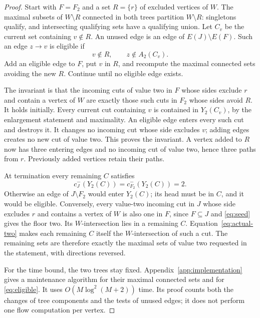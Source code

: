 \documentclass[11pt]{article}
\theoremstyle{definition}
\theoremstyle{remark}
\begin{document}
\begin{proof}
Start with \(F=F_2\) and a set \(R=\{r\}\) of excluded vertices of \(W\). The maximal subsets of \(W\setminus R\) connected in both trees partition \(W\setminus R\): singletons qualify, and intersecting qualifying sets have a qualifying union. Let \(C_v\) be the current set containing \(v\notin R\). An unused edge is an edge of \(E(J)\setminus E(F)\). Such an edge \(z\to v\) is eligible if
\begin{equation}
 v\notin R,\qquad z\notin A_2(C_v).
 \label{eq:eligible}
\end{equation}
Add an eligible edge to \(F\), put \(v\) in \(R\), and recompute the maximal connected sets avoiding the new \(R\). Continue until no eligible edge exists.

The invariant is that the incoming cuts of value two in \(F\) whose sides exclude \(r\) and contain a vertex of \(W\) are exactly those such cuts in \(F_2\) whose sides avoid \(R\). It holds initially. Every current cut containing \(v\) is contained in \(Y_2(C_v)\), by the enlargement statement and maximality. An eligible edge enters every such cut and destroys it. It changes no incoming cut whose side excludes \(v\); adding edges creates no new cut of value two. This proves the invariant. A vertex added to \(R\) now has three entering edges and no incoming cut of value two, hence three paths from \(r\). Previously added vertices retain their paths.

At termination every remaining \(C\) satisfies
\begin{equation}
 c_J^-(Y_2(C))=c_{F_2}^-(Y_2(C))=2.
 \label{eq:actual-two}
\end{equation}
Otherwise an edge of \(J\setminus F_2\) would enter \(Y_2(C)\); its head must be in \(C\), and it would be eligible. Conversely, every value-two incoming cut in \(J\) whose side excludes \(r\) and contains a vertex of \(W\) is also one in \(F\), since \(F\subseteq J\) and \eqref{eq:seed} gives the floor two. Its \(W\)-intersection lies in a remaining \(C\). Equation~\eqref{eq:actual-two} makes each remaining \(C\) itself the \(W\)-intersection of such a cut. The remaining sets are therefore exactly the maximal sets of value two requested in the statement, with directions reversed.

For the time bound, the two trees stay fixed. Appendix~\ref{app:implementation} gives a maintenance algorithm for their maximal connected sets and for \eqref{eq:eligible}. It uses \(O(M\log^2(M+2))\) time. Its proof counts both the changes of tree components and the tests of unused edges; it does not perform one flow computation per vertex.
\end{proof}
\end{document}
